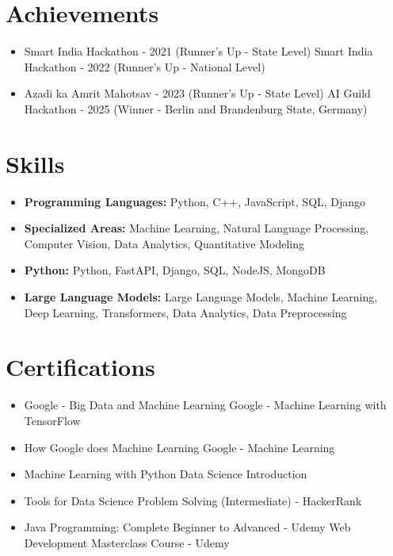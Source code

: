 \documentclass[a4paper,10pt]{article}
\begin{document}
\section*{Achievements}
\begin{itemize}
\item Smart India Hackathon - 2021 (Runner's Up - State Level) \hfill Smart India Hackathon - 2022 (Runner's Up - National Level)
\item Azadi ka Amrit Mahotsav - 2023 (Runner's Up - State Level) \hfill AI Guild Hackathon - 2025 (Winner - Berlin and Brandenburg State, Germany)
\end{itemize}

\section*{Skills}
\begin{itemize}
  \item \textbf{Programming Languages:} Python, C++, JavaScript, SQL, Django
  \item \textbf{Specialized Areas:} Machine Learning, Natural Language Processing, Computer Vision, Data Analytics, Quantitative Modeling
  \item \textbf{Python:} Python, FastAPI, Django, SQL, NodeJS, MongoDB
  \item \textbf{Large Language Models:} Large Language Models, Machine Learning, Deep Learning, Transformers, Data Analytics, Data Preprocessing
\end{itemize}

\section*{Certifications}
\begin{itemize}
\item Google - Big Data and Machine Learning \hfill Google - Machine Learning with TensorFlow
\item How Google does Machine Learning \hfill Google - Machine Learning
\item Machine Learning with Python \hfill Data Science Introduction
\item Tools for Data Science \hfill Problem Solving (Intermediate) - HackerRank
\item Java Programming: Complete Beginner to Advanced - Udemy \hfill Web Development Masterclass Course - Udemy
\end{itemize}
\end{document}
